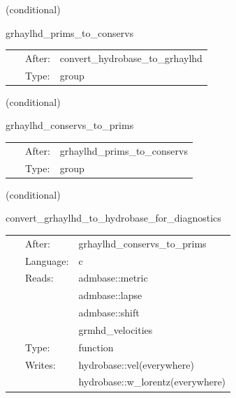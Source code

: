 \documentclass{article}
\begin{document}
\vspace{5mm}

   (conditional) 

\hspace{5mm} grhaylhd\_prims\_to\_conservs 

\hspace{5mm}{\it compute conservative variables from primitives } 


\hspace{5mm}

 \begin{tabular*}{160mm}{cll} 
~ & After:  & convert\_hydrobase\_to\_grhaylhd \\ 
~ & Type:  & group \\ 
\end{tabular*} 


\vspace{5mm}

   (conditional) 

\hspace{5mm} grhaylhd\_conservs\_to\_prims 

\hspace{5mm}{\it compute primitive variables from conservatives } 


\hspace{5mm}

 \begin{tabular*}{160mm}{cll} 
~ & After:  & grhaylhd\_prims\_to\_conservs \\ 
~ & Type:  & group \\ 
\end{tabular*} 


\vspace{5mm}

   (conditional) 

\hspace{5mm} convert\_grhaylhd\_to\_hydrobase\_for\_diagnostics 

\hspace{5mm}{\it convert grhaylhd-native variables to hydrobase } 


\hspace{5mm}

 \begin{tabular*}{160mm}{cll} 
~ & After:  & grhaylhd\_conservs\_to\_prims \\ 
~ & Language:  & c \\ 
~ & Reads:  & admbase::metric \\ 
~& ~ &admbase::lapse\\ 
~& ~ &admbase::shift\\ 
~& ~ &grmhd\_velocities\\ 
~ & Type:  & function \\ 
~ & Writes:  & hydrobase::vel(everywhere) \\ 
~& ~ &hydrobase::w\_lorentz(everywhere)\\ 
\end{tabular*} 
\end{document}
